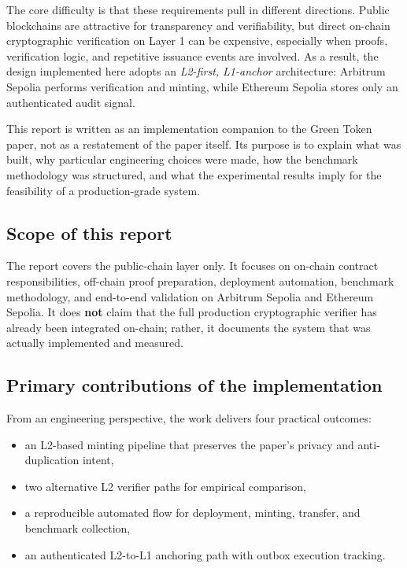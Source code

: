 \documentclass[11pt]{article}
\begin{document}
The core difficulty is that these requirements pull in different directions. Public blockchains are attractive for transparency and verifiability, but direct on-chain cryptographic verification on Layer 1 can be expensive, especially when proofs, verification logic, and repetitive issuance events are involved. As a result, the design implemented here adopts an \emph{L2-first, L1-anchor} architecture: Arbitrum Sepolia performs verification and minting, while Ethereum Sepolia stores only an authenticated audit signal.

This report is written as an implementation companion to the Green Token paper, not as a restatement of the paper itself. Its purpose is to explain what was built, why particular engineering choices were made, how the benchmark methodology was structured, and what the experimental results imply for the feasibility of a production-grade system.

\subsection{Scope of this report}
The report covers the public-chain layer only. It focuses on on-chain contract responsibilities, off-chain proof preparation, deployment automation, benchmark methodology, and end-to-end validation on Arbitrum Sepolia and Ethereum Sepolia. It does \textbf{not} claim that the full production cryptographic verifier has already been integrated on-chain; rather, it documents the system that was actually implemented and measured.

\subsection{Primary contributions of the implementation}
From an engineering perspective, the work delivers four practical outcomes:

\begin{itemize}
  \item an L2-based minting pipeline that preserves the paper's privacy and anti-duplication intent,
  \item two alternative L2 verifier paths for empirical comparison,
  \item a reproducible automated flow for deployment, minting, transfer, and benchmark collection,
  \item an authenticated L2-to-L1 anchoring path with outbox execution tracking.
\end{itemize}
\end{document}
